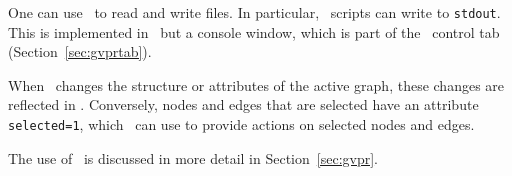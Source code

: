 One can use \gvpr\ to read and write files. In particular, \gvpr\ scripts
can write to {\tt stdout}. This is implemented in \smyrna\ but a console
window, which is part of the \gvpr\ control tab (Section~\ref{sec:gvprtab}).

When \gvpr\ changes the structure or attributes of the active graph,
these changes are reflected in \smyrna. Conversely, nodes and edges
that are selected have an attribute {\tt selected=1}, which \gvpr\
can use to provide actions on selected nodes and edges.

The use of \gvpr\ is discussed in more detail in Section~\ref{sec:gvpr}.

